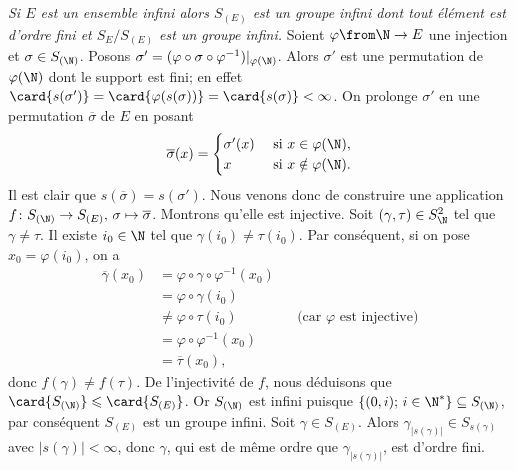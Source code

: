 \begin{enumerate}
    \emph{Si $E$ est un ensemble infini alors $S_{(E)}$ est un groupe infini dont tout élément est d'ordre fini et $S_E/S_{(E)}$ est un groupe infini.}
    Soient $\varphi\from\N\to E$ une injection et $\sigma\in S_{(\N)}$.
    Posons $\sigma'= (\varphi\circ\sigma\circ\varphi^{-1})|_{\varphi(\N)}$.
    Alors $\sigma'$ est une permutation de $\varphi(\N)$ dont le support est fini; en effet $\card{s(\sigma')} = \card{\varphi(s(\sigma))} = \card{s(\sigma)} <\infty$.  
    On prolonge $\sigma'$ en une permutation $\overline{\sigma}$ de $E$ en posant
    \[
      \overline{\sigma}(x) = 
      \begin{cases}
        \sigma'(x) & \text{ si } x\in\varphi(\N), \\ 
        x          & \text{ si } x\notin\varphi(\N). 
      \end{cases}
    \]
    Il est clair que $s(\overline{\sigma}) = s(\sigma')$.
    Nous venons donc de construire une application $f\colon S_{(\N)}\rightarrow S_{(E)},\,\sigma\mapsto\overline{\sigma}$.
    Montrons qu'elle est injective.
    Soit $(\gamma, \tau)\in S_{\N}^2$ tel que $\gamma\neq\tau$. 
    Il existe $i_0\in\N$ tel que $\gamma(i_0)\neq\tau(i_0)$. 
    Par conséquent, si on pose $x_0 = \varphi(i_0)$, on a
    \begin{align*}
      \overline{\gamma}(x_0) 
      &= \varphi\circ\gamma\circ\varphi^{-1}(x_0) \\
      &= \varphi\circ\gamma(i_0) \\
      &\neq \varphi\circ\tau(i_0) && \text{(car $\varphi$ est injective)} \\
      &= \varphi\circ\varphi^{-1}(x_0) \\
      &= \overline{\tau}(x_0),
    \end{align*}
    donc $f(\gamma) \neq f(\tau)$.
    De l'injectivité de $f$, nous déduisons que $\card{S_{(\N)}}\leqslant \card{S_{(E)}}$. 
    Or $S_{(\N)}$ est infini puisque $\{(0,i);\,i\in\N^*\}\subseteq S_{(\N)}$, par conséquent $S_{(E)}$ est un groupe infini.
    Soit $\gamma\in S_{(E)}$. 
    Alors $\gamma_{|s(\gamma)|}\in S_{s(\gamma)}$ avec $|s(\gamma)|<\infty$, donc $\gamma$, qui est de même ordre que $\gamma_{|s(\gamma)|}$, est d'ordre fini.


\end{enumerate}
